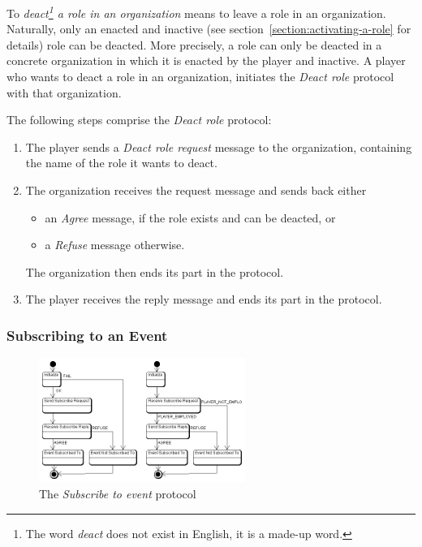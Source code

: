 To \textit{deact\footnote{The word \textit{deact} does not exist in English, it is a made-up word.} a role in an organization} means to leave a role in an organization.
Naturally, only an enacted and inactive (see section~\ref{section:activating-a-role} for details) role can be deacted.
More precisely, a role can only be deacted in a concrete organization in which it is enacted by the player and inactive.
A player who wants to deact a role in an organization, initiates the \textit{Deact role} protocol with that organization.

The following steps comprise the \textit{Deact role} protocol:
\begin{enumerate}
	\item The player sends a \textit{Deact role request} message to the organization, containing the name of the role it wants to deact.
	\item The organization receives the request message and sends back either
	\begin{itemize}
		\item an \textit{Agree} message, if the role exists and can be deacted, or
		\item a \textit{Refuse} message otherwise.
	\end{itemize}
	The organization then ends its part in the protocol.
	\item The player receives the reply message and ends its part in the protocol.
\end{enumerate}

\subsubsection{Subscribing to an Event}

\begin{figure}[ht]
	\centering
	\includegraphics[width=0.6\textwidth]{images/thespian/subscribe-to-event-protocol}
	\caption{The \textit{Subscribe to event} protocol}
	\label{figure:thespian-subscribe-to-event-protocol}
\end{figure}

